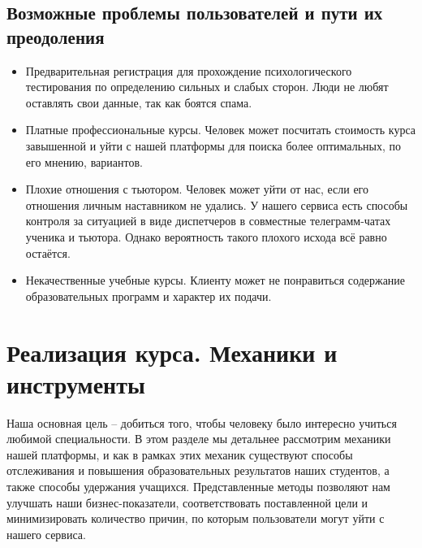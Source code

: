 \documentclass[12pt]{article}
\begin{document}
\subsection{Возможные проблемы пользователей и пути их преодоления}
\begin{itemize}
    \item Предварительная регистрация для прохождение психологического тестирования по определению сильных и слабых сторон. Люди не любят оставлять свои данные, так как боятся спама.
    \item Платные профессиональные курсы. Человек может посчитать стоимость курса завышенной и уйти с нашей платформы для поиска более оптимальных, по его мнению, вариантов.
    \item Плохие отношения с тьютором. Человек может уйти от нас, если его отношения личным наставником не удались. У нашего сервиса есть способы контроля за ситуацией в виде диспетчеров в совместные телеграмм-чатах ученика и тьютора. Однако вероятность такого плохого исхода всё равно остаётся.
    \item Некачественные учебные курсы. Клиенту может не понравиться содержание образовательных программ и характер их подачи.
\end{itemize}

\section{Реализация курса. Механики и инструменты}
Наша основная цель -- добиться того, чтобы человеку было интересно учиться любимой специальности. В этом разделе мы детальнее рассмотрим механики нашей платформы, и как в рамках этих механик существуют способы отслеживания и повышения образовательных результатов наших студентов, а также способы удержания учащихся. Представленные методы позволяют нам улучшать наши бизнес-показатели, соответствовать поставленной цели и минимизировать количество причин, по которым пользователи могут уйти с нашего сервиса.
\end{document}

